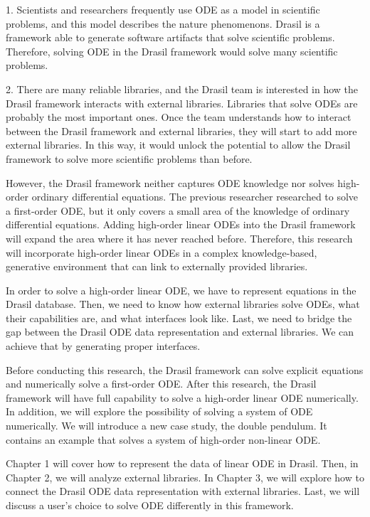1. Scientists and researchers frequently use ODE as a model in scientific problems, and this model describes the nature phenomenons. Drasil is a framework able to generate software artifacts that solve scientific problems. Therefore, solving ODE in the Drasil framework would solve many scientific problems.

2. There are many reliable libraries, and the Drasil team is interested in how the Drasil framework interacts with external libraries. Libraries that solve ODEs are probably the most important ones. Once the team understands how to interact between the Drasil framework and external libraries, they will start to add more external libraries. In this way, it would unlock the potential to allow the Drasil framework to solve more scientific problems than before. 

However, the Drasil framework neither captures ODE knowledge nor solves high-order ordinary differential equations. The previous researcher researched to solve a first-order ODE, but it only covers a small area of the knowledge of ordinary differential equations. Adding high-order linear ODEs into the Drasil framework will expand the area where it has never reached before. Therefore, this research will incorporate high-order linear ODEs in a complex knowledge-based, generative environment that can link to externally provided libraries.

In order to solve a high-order linear ODE, we have to represent equations in the Drasil database. Then, we need to know how external libraries solve ODEs, what their capabilities are, and what interfaces look like. Last, we need to bridge the gap between the Drasil ODE data representation and external libraries. We can achieve that by generating proper interfaces.

Before conducting this research, the Drasil framework can solve explicit equations and numerically solve a first-order ODE. After this research, the Drasil framework will have full capability to solve a high-order linear ODE numerically. In addition, we will explore the possibility of solving a system of ODE numerically. We will introduce a new case study, the double pendulum. It contains an example that solves a system of high-order non-linear ODE.

Chapter 1 will cover how to represent the data of linear ODE in Drasil. Then, in Chapter 2, we will analyze external libraries. In Chapter 3, we will explore how to connect the Drasil ODE data representation with external libraries. Last, we will discuss a user's choice to solve ODE differently in this framework.
